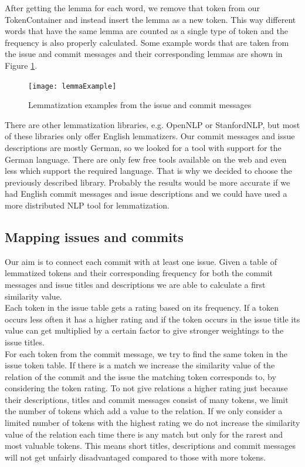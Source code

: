 After getting the lemma for each word, we remove that token from our TokenContainer and instead insert the lemma as a new token.
This way different words that have the same lemma are counted as a single type of token and the frequency is also properly calculated. Some example words that are taken from the issue and commit messages and their corresponding lemmas are shown in Figure \ref{fig:lemma}.\\

\begin{figure}
\centering
\texttt{[image: lemmaExample]}
\caption{Lemmatization examples from the issue and commit messages}
\label{fig:lemma}
\end{figure}

There are other lemmatization libraries, e.g. OpenNLP or StanfordNLP, but most of these libraries only offer English lemmatizers.
Our commit messages and issue descriptions are mostly German, so we looked for a tool with support for the German language.
There are only few free tools available on the web and even less which support the required language.
That is why we decided to choose the previously described library.
Probably the results would be more accurate if we had English commit messages and issue descriptions and we could have used a more distributed NLP tool for lemmatization.

\subsection{Mapping issues and commits}

Our aim is to connect each commit with at least one issue.
Given a table of lemmatized tokens and their corresponding frequency for both the commit messages and issue titles and descriptions we are able to calculate a first similarity value.\\
Each token in the issue table gets a rating based on its frequency.
If a token occurs less often it has a higher rating and if the token occurs in the issue title its value can get multiplied by a certain factor to give stronger weightings to the issue titles.\\

For each token from the commit message, we try to find the same token in the issue token table.
If there is a match we increase the similarity value of the relation of the commit and the issue the matching token corresponds to, by considering the token rating.
To not give relations a higher rating just because their descriptions, titles and commit messages consist of many tokens, we limit the number of tokens which add a value to the relation.
If we only consider a limited number of tokens with the highest rating we do not increase the similarity value of the relation each time there is any match but only for the rarest and most valuable tokens.
This means short titles, descriptions and commit messages will not get unfairly disadvantaged compared to those with more tokens.\\

